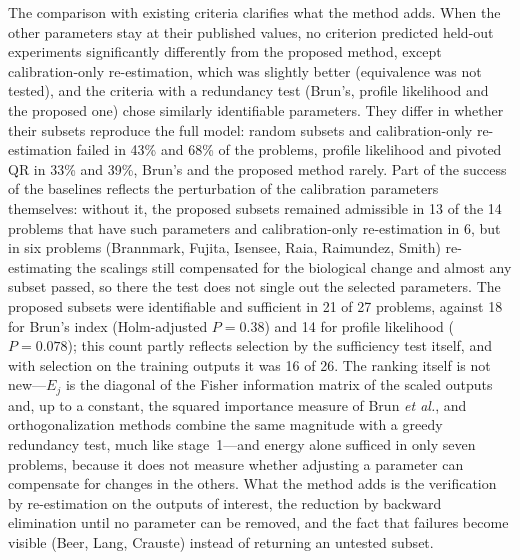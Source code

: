 \documentclass[pdflatex,sn-nature]{sn-jnl}
\theoremstyle{plain}
\begin{document}
The comparison with existing criteria clarifies what the method adds. When the other parameters stay at their published values, no criterion predicted held-out experiments significantly differently from the proposed method, except calibration-only re-estimation, which was slightly better (equivalence was not tested), and the criteria with a redundancy test (Brun's, profile likelihood and the proposed one) chose similarly identifiable parameters. They differ in whether their subsets reproduce the full model: random subsets and calibration-only re-estimation failed in 43\% and 68\% of the problems, profile likelihood and pivoted QR in 33\% and 39\%, Brun's and the proposed method rarely. Part of the success of the baselines reflects the perturbation of the calibration parameters themselves: without it, the proposed subsets remained admissible in 13 of the 14 problems that have such parameters and calibration-only re-estimation in 6, but in six problems (Brannmark, Fujita, Isensee, Raia, Raimundez, Smith) re-estimating the scalings still compensated for the biological change and almost any subset passed, so there the test does not single out the selected parameters. The proposed subsets were identifiable and sufficient in 21 of 27 problems, against 18 for Brun's index (Holm-adjusted $P=0.38$) and 14 for profile likelihood ($P=0.078$); this count partly reflects selection by the sufficiency test itself, and with selection on the training outputs it was 16 of 26. The ranking itself is not new---$E_j$ is the diagonal of the Fisher information matrix of the scaled outputs and, up to a constant, the squared importance measure of Brun \emph{et al.}\cite{bib9}, and orthogonalization methods\cite{bib43,bib44,bib45} combine the same magnitude with a greedy redundancy test, much like stage~1---and energy alone sufficed in only seven problems, because it does not measure whether adjusting a parameter can compensate for changes in the others. What the method adds is the verification by re-estimation on the outputs of interest, the reduction by backward elimination until no parameter can be removed, and the fact that failures become visible (Beer, Lang, Crauste) instead of returning an untested subset.
\end{document}

